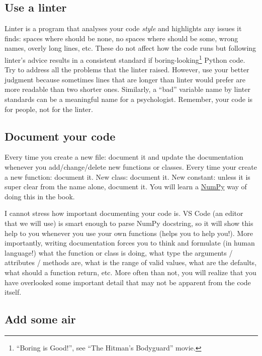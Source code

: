 \documentclass[
]{book}
\begin{document}
\hypertarget{use-a-linter}{%
\subsection{Use a linter}\label{use-a-linter}}

Linter is a program that analyses your code \emph{style} and highlights any issues it finds: spaces where should be none, no spaces where should be some, wrong names, overly long lines, etc. These do not affect how the code runs but following linter's advice results in a consistent standard if boring-looking\footnote{``Boring is Good!'', see ``The Hitman's Bodyguard'' movie.} Python code. Try to address all the problems that the linter raised. However, use your better judgment because sometimes lines that are longer than linter would prefer are more readable than two shorter ones. Similarly, a ``bad'' variable name by linter standards can be a meaningful name for a psychologist. Remember, your code is for people, not for the linter.

\hypertarget{document-your-code}{%
\subsection{Document your code}\label{document-your-code}}

Every time you create a new file: document it and update the documentation whenever you add/change/delete new functions or classes. Every time your create a new function: document it. New class: document it. New constant: unless it is super clear from the name alone, document it. You will learn a \href{https://numpydoc.readthedocs.io/en/latest/format.html}{NumPy} way of doing this in the book.

I cannot stress how important documenting your code is. VS Code (an editor that we will use) is smart enough to parse NumPy docstring, so it will show this help to you whenever you use your own functions (helps you to help you!). More importantly, writing documentation forces you to think and formulate (in human language!) what the function or class is doing, what type the arguments / attributes / methods are, what is the range of valid values, what are the defaults, what should a function return, etc. More often than not, you will realize that you have overlooked some important detail that may not be apparent from the code itself.

\hypertarget{add-some-air}{%
\subsection{Add some air}\label{add-some-air}}
\end{document}
